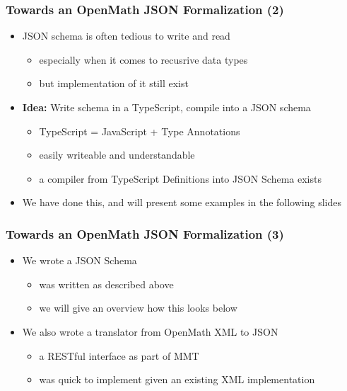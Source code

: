 \documentclass[usenames,dvipsnames]{beamer}
\begin{document}
\begin{frame}
    \frametitle{Towards an OpenMath JSON Formalization (2)}
    \begin{itemize}
        \item JSON schema is often tedious to write and read
        \begin{itemize}
            \item especially when it comes to recusrive data types
            \item but implementation of it still exist 
        \end{itemize}
        \item \textbf{Idea:} Write schema in a TypeScript, compile into a JSON schema
        \begin{itemize}
            \item TypeScript = JavaScript + Type Annotations
            \item easily writeable and understandable
            \item a compiler from TypeScript Definitions into JSON Schema exists
        \end{itemize}
        \item We have done this, and will present some examples in the following slides
    \end{itemize}
\end{frame}

\begin{frame}
    \frametitle{Towards an OpenMath JSON Formalization (3)}
    \begin{itemize}
        \item We wrote a JSON Schema
        \begin{itemize}
            \item was written as described above
            \item we will give an overview how this looks below
        \end{itemize}
        \item We also wrote a translator from OpenMath XML to JSON
        \begin{itemize}
            \item a RESTful interface as part of MMT%
            \item was quick to implement given an existing XML implementation
        \end{itemize}
    \end{itemize}
\end{frame}
\end{document}

